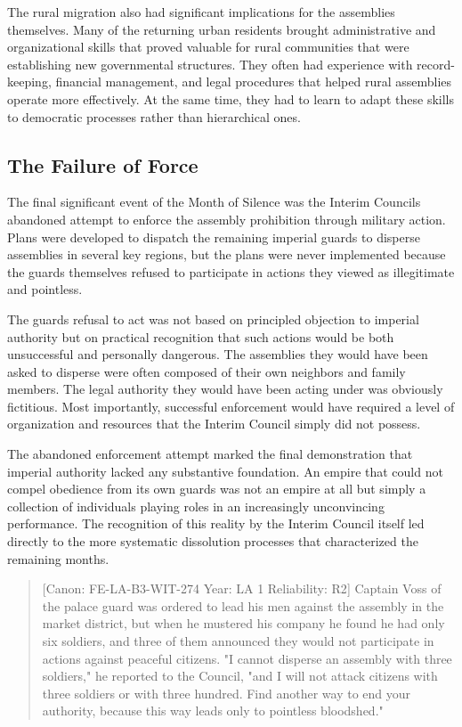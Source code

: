 The rural migration also had significant implications for the assemblies
themselves. Many of the returning urban residents brought administrative
and organizational skills that proved valuable for rural communities
that were establishing new governmental structures. They often had
experience with record-keeping, financial management, and legal
procedures that helped rural assemblies operate more effectively. At the
same time, they had to learn to adapt these skills to democratic
processes rather than hierarchical ones.

\subsection{The Failure of Force}\label{the-failure-of-force}

The final significant event of the Month of Silence was the Interim
Council\textquotesingle s abandoned attempt to enforce the assembly
prohibition through military action. Plans were developed to dispatch
the remaining imperial guards to disperse assemblies in several key
regions, but the plans were never implemented because the guards
themselves refused to participate in actions they viewed as illegitimate
and pointless.

The guards\textquotesingle{} refusal to act was not based on principled
objection to imperial authority but on practical recognition that such
actions would be both unsuccessful and personally dangerous. The
assemblies they would have been asked to disperse were often composed of
their own neighbors and family members. The legal authority they would
have been acting under was obviously fictitious. Most importantly,
successful enforcement would have required a level of organization and
resources that the Interim Council simply did not possess.

The abandoned enforcement attempt marked the final demonstration that
imperial authority lacked any substantive foundation. An empire that
could not compel obedience from its own guards was not an empire at all
but simply a collection of individuals playing roles in an increasingly
unconvincing performance. The recognition of this reality by the Interim
Council itself led directly to the more systematic dissolution processes
that characterized the remaining months.

\begin{quote}
{[}Canon: FE-LA-B3-WIT-274 \textbar{} Year: LA 1 \textbar{} Reliability:
R2{]} Captain Voss of the palace guard was ordered to lead his men
against the assembly in the market district, but when he mustered his
company he found he had only six soldiers, and three of them announced
they would not participate in actions against peaceful citizens. "I
cannot disperse an assembly with three soldiers," he reported to the
Council, "and I will not attack citizens with three soldiers or with
three hundred. Find another way to end your authority, because this way
leads only to pointless bloodshed."
\end{quote}

